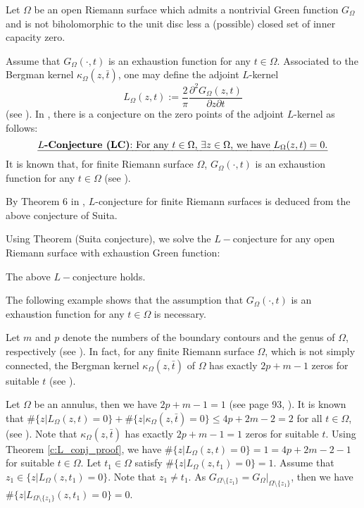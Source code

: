 Let $\Omega$ be an open Riemann surface which admits a nontrivial
Green function $G_{\Omega}$ and is not biholomorphic to the unit
disc less a (possible) closed set of inner capacity zero.

Assume that $G_{\Omega}(\cdot,t)$ is an exhaustion function for any
$t\in\Omega$. Associated to the Bergman kernel
$\kappa_{\Omega}(z,\bar{t})$, one may define the adjoint $L$-kernel
$$L_{\Omega}(z,t):=\frac{2}{\pi}\frac{\partial^{2}G_{\Omega}(z,t)}{\partial
z \partial t}$$ (see \cite{schiffer}). In \cite{yamada98}, there is a
conjecture on the zero points of the adjoint $L$-kernel as follows:
\[
\text{\emph{\textbf{$L$-Conjecture (LC)}:
For any $t\in\Omega$, $\exists z\in\Omega$, we have $L_{\Omega}(z,t)=0$.}}
\]
It is known that, for finite Riemann surface $\Omega$,
$G_{\Omega}(\cdot,t)$ is an exhaustion function for any $t\in\Omega$
(see \cite{yamada98}).

By Theorem 6 in \cite{yamada98}, $L$-conjecture for finite Riemann
surfaces is deduced from the above conjecture of Suita.

Using Theorem (Suita conjecture), we solve the $L-$conjecture for any
open Riemann surface with exhaustion Green function:

\begin{theorem}
  The above $L-$conjecture holds.
\end{theorem}

The following example shows that the assumption that
$G_{\Omega}(\cdot,t)$ is an exhaustion function for any $t\in\Omega$
is necessary.

Let $m$ and $p$ denote the numbers of the boundary contours and the
genus of $\Omega$, respectively (see \cite{suita76}). In fact, for
any finite Riemann surface $\Omega$, which is not simply connected,
the Bergman kernel $\kappa_{\Omega}(z,\bar{t})$ of $\Omega$ has
exactly $2p+m-1$ zeros for suitable $t$ (see \cite{suita76}).

Let $\Omega$ be an annulus, then we have $2p+m-1=1$ (see page 93,
\cite{schiffer}). It is known that
$\#\{z|L_{\Omega}(z,t)=0\}+\#\{z|\kappa_{\Omega}(z,\bar{t})=0\}\leq4p+2m-2=2$
for all $t\in\Omega$, (see \cite{suita76}). Note that
$\kappa_{\Omega}(z,\bar{t})$ has exactly $2p+m-1=1$ zeros for
suitable $t$. Using Theorem \ref{c:L_conj_proof}, we have
$\#\{z|L_{\Omega}(z,t)=0\}=1=4p+2m-2-1$ for suitable $t\in\Omega$.
Let $t_{1}\in\Omega$ satisfy $\#\{z|L_{\Omega}(z,t_{1})=0\}=1$.
Assume that $z_{1}\in\{z|L_{\Omega}(z,t_{1})=0\}$. Note that
$z_{1}\neq t_{1}$. As
$G_{\Omega\setminus\{z_{1}\}}=G_{\Omega}|_{\Omega\setminus\{z_{1}\}}$,
then we have $\#\{z|L_{\Omega\setminus\{z_{1}\}}(z,t_{1})=0\}=0$.


